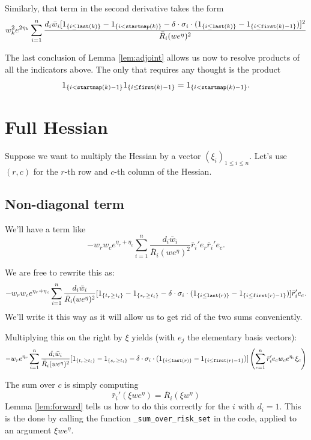 \documentclass{article}
\begin{document}
Similarly, that term in the second
derivative takes the form 
$$
w_k^2 e^{2 \eta_k}\sum_{i=1}^n \frac{d_i \bar{w}_i [1_{\{i \leq {\tt last}(k)\}} - 1_{\{i < {\tt startmap}(k)\}} - \delta \cdot \sigma_i \cdot( 1_{\{i \leq {\tt last}(k)\}} - 1_{\{i \leq {\tt first}(k)-1\}}) ]^2}{\bar{R}_i(we^{\eta})^2}
$$

The last conclusion of Lemma \ref{lem:adjoint} allows us now to resolve products of all the indicators above. The only that requires any thought is the product 
$$
1_{\{i < {\tt startmap}(k)-1\}} 1_{\{i \leq {\tt first}(k)-1\}} = 1_{\{i < {\tt startmap}(k)-1\}}.$$

\section{Full Hessian}

Suppose we want to multiply
the Hessian by a vector $(\xi_i)_{1 \leq i \leq n}$. Let's use $(r,c)$ for the $r$-th row and $c$-th column of the Hessian.


\subsection{Non-diagonal term}
We'll have a term like 
$$
-w_r w_c e^{ \eta_r + \eta_c} \sum_{i=1}^n \frac{d_i \bar{w}_i }{\bar{R}_i(we^{\eta})^2} \bar{r}_i'e_r \bar{r}_i'e_c.
$$

We are free to rewrite this as:
$$
-w_r w_c e^{ \eta_r + \eta_c} \sum_{i=1}^n \frac{d_i \bar{w}_i }{\bar{R}_i(we^{\eta})^2} [1_{\{t_r \geq t_i\}} - 1_{\{s_r \geq t_i\}} - \delta \cdot \sigma_i \cdot (1_{\{i \leq {\tt last}(r)\}} - 1_{\{i \leq {\tt first}(r)-1\}})] \bar{r}_i'e_c.
$$
We'll write it this way as it will allow
us to get rid of the two sums conveniently.

Multiplying this on the right by $\xi$ yields (with $e_j$ the elementary basis vectors):
$$
-w_r e^{\eta_r}  \sum_{i=1}^n   \frac{d_i \bar{w}_i }{\bar{R}_i(we^{\eta})^2} [1_{\{t_r \geq t_i\}} - 1_{\{s_r \geq t_i\}} - \delta \cdot \sigma_i \cdot (1_{\{i \leq {\tt last}(r)\}} - 1_{\{i \leq {\tt first}(r)-1\}})] \left(\sum_{c=1}^n \bar{r}_i'e_c w_c e^{\eta_c} \xi_c\right)
$$

The sum over $c$ is simply computing
$$
\bar{r}_i'(\xi w e^{\eta}) = \bar{R}_i(\xi w^{\eta})
$$
 Lemma \ref{lem:forward} tells us how to do 
 this correctly for the $i$ with $d_i=1$.
 This is the done by calling the function {\tt \_sum\_over\_risk\_set} in the code, applied to an argument $\xi w e^{\eta}$. 
\end{document}
